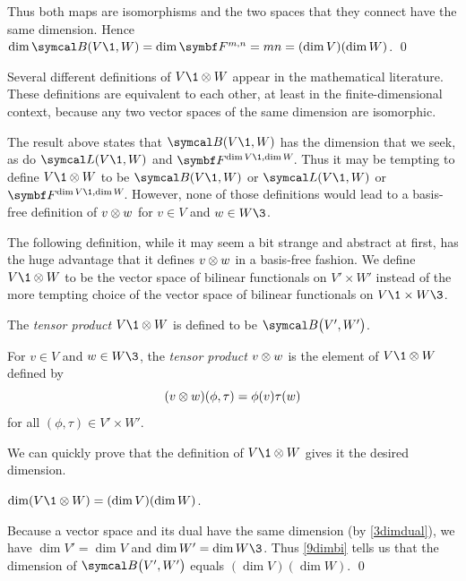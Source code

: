 Thus both maps are isomorphisms and the two spaces that they connect have the same dimension. Hence
$\dim \B(V\1,W)= \dim \F{m,n} = mn = (\dim V)(\dim W)$.
\qed

Several different definitions of $V\1 \tensor W$ appear in the mathematical literature. These definitions are equivalent to each other, at least in the finite-dimensional context, because any two vector spaces of the same dimension are isomorphic.

The result above states that $\B(V\1, W)$ has the dimension that we seek, as do $\L(V\1, W)$ and $\FF{\dim V\1, \dim W}$. Thus it may be tempting to define $V\1 \tensor W$ to be $\B(V\1, W)$ or $\L(V\1, W)$ or $\FF{\dim V\1, \dim W}$. However, none of those definitions would lead to a basis-free definition of $v \otimes w$ for $v \in V$ and $w \in W\3$.

The following definition, while it may seem a bit strange and abstract at first, has the huge advantage that it defines $v \otimes w$ in a basis-free fashion. We define $V\1 \tensor W$ to be the vector space of bilinear functionals on $V'\! \times W'$ instead of the more tempting choice of the vector space of bilinear functionals on $V\1 \times W\3$.

{\vspace{-2.3bp}
\begin{Itemize}\addtolength{\itemsep}{-.01in}
\item
The \emph{tensor product} $V\1 \tensor W$ is defined to be $\B\paren[\big]{V', W'}$.
\item
For $v \in V$ and $w \in W\3$, the \emph{tensor product} $v \otimes w$ is the element of $V\1 \tensor W$ defined by
\[
(v \otimes w)(\phi, \tau) = \phi(v) \tau(w)
\]
for all $(\phi, \tau) \in V'\! \times W'\!$.
\end{Itemize}}

We can quickly prove that the definition of $V\1 \tensor W$ gives it the desired dimension.

{$\dim (V\1 \tensor W) = (\dim V)(\dim W)$.}

\proof
 Because a vector space and its dual have the same dimension (by \ref{3dimdual}), we have $\dim V' = \dim V$ and $\dim W' = \dim W\3$. Thus \ref{9dimbi} tells us that the dimension of $\B\paren[\big]{V', W'}$ equals $(\dim V)(\dim W)$.
\qed

